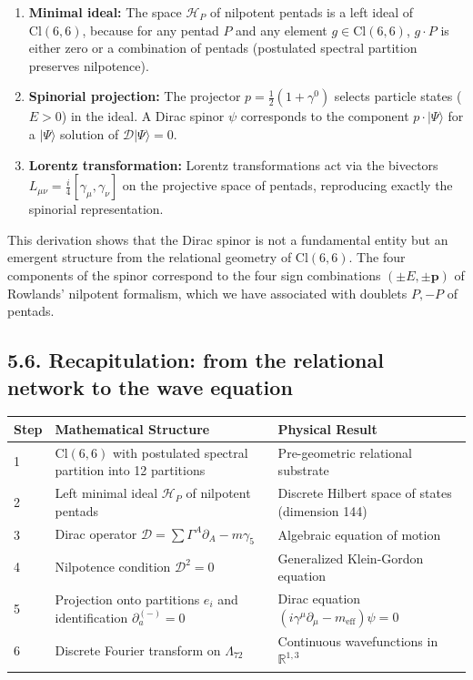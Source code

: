 \documentclass[11pt]{article}
\providecommand{\tightlist}{\setlength{\itemsep}{2pt}\setlength{\parskip}{6pt}}
\let\oldmathcal\mathcal
\renewcommand{\mathcal}[1]{\oldmathcal{#1}}
\providecommand{\tightlist}{%
  \setlength{\itemsep}{2pt}\setlength{\parskip}{6pt}
}
\begin{document}
\begin{enumerate}
\def\labelenumi{\arabic{enumi}.}
\tightlist
\item
  \textbf{Minimal ideal:} The space \(\mathcal{H}_P\) of nilpotent
  pentads is a left ideal of \(\text{Cl}(6,6)\), because for any pentad
  \(P\) and any element \(g \in \text{Cl}(6,6)\), \(g \cdot P\) is
  either zero or a combination of pentads (postulated spectral partition
  preserves nilpotence).
\item
  \textbf{Spinorial projection:} The projector
  \(p = \frac{1}{2}(1 + \gamma^0)\) selects particle states (\(E>0\)) in
  the ideal. A Dirac spinor \(\psi\) corresponds to the component
  \(p \cdot |\Psi\rangle\) for a \(|\Psi\rangle\) solution of
  \(\mathcal{D}|\Psi\rangle=0\).
\item
  \textbf{Lorentz transformation:} Lorentz transformations act via the
  bivectors \(L_{\mu\nu} = \frac{i}{4}[\gamma_\mu, \gamma_\nu]\) on the
  projective space of pentads, reproducing exactly the spinorial
  representation.
\end{enumerate}

This derivation shows that the Dirac spinor is not a fundamental entity
but an emergent structure from the relational geometry of
\(\text{Cl}(6,6)\). The four components of the spinor correspond to the
four sign combinations \((\pm E, \pm \mathbf{p})\) of Rowlands'
nilpotent formalism, which we have associated with doublets \({P, -P}\)
of pentads.

\hypertarget{recapitulation-from-the-relational-network-to-the-wave-equation}{%
\subsection{5.6. Recapitulation: from the relational network to the wave
equation}\label{recapitulation-from-the-relational-network-to-the-wave-equation}}

\begin{table}[H]
\centering
\begin{tabular}{@{}lll@{}}
\toprule
Step & Mathematical Structure & Physical Result \\ \midrule
1 & $\text{Cl}(6,6)$ with postulated spectral partition into 12 partitions & Pre-geometric relational substrate \\
2 & Left minimal ideal $\mathcal{H}_P$ of nilpotent pentads & Discrete Hilbert space of states (dimension 144) \\
3 & Dirac operator $\mathcal{D} = \sum \Gamma^A \partial_A - m\gamma_5$ & Algebraic equation of motion \\
4 & Nilpotence condition $\mathcal{D}^2=0$ & Generalized Klein-Gordon equation \\
5 & Projection onto partitions $e_i$ and identification $\partial_a^{(-)}=0$ & Dirac equation $(i\gamma^\mu\partial_\mu - m_{\text{eff}})\psi=0$ \\
6 & Discrete Fourier transform on $\Lambda_{72}$ & Continuous wavefunctions in $\mathbb{R}^{1,3}$ \\ \bottomrule
\end{tabular}
\end{table}
\end{document}
